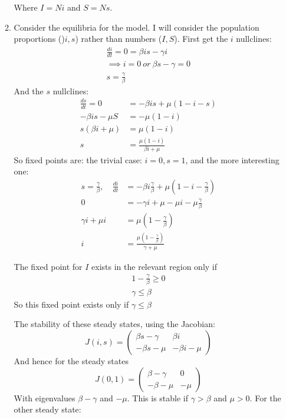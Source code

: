 \documentclass{/home/janmebows/Documents/LatexTemplates/myassignment}
\newcommand{\odd}[2]{\frac{d#1}{d#2}}
\begin{document}
\begin{enumerate}
\begin{enumerate}[label=(\roman*)]
		Where $I = Ni$ and $S = Ns$.
		\item %
			Consider the equilibria for the model. I will consider the population proportions ()$i,s$) rather than numbers ($I,S$).
			First get the $i$ nullclines:
			\begin{align*}
				\odd it = 0=\beta is -\gamma i\\
				\implies i=0 \ or \ \beta s - \gamma =0\\
				s = \frac{\gamma}{\beta}
			\end{align*}
			And the $s$ nullclines:
			\begin{align*}
				\odd st = 0 &= -\beta is+ \mu(1-i-s)\\
				-\beta is - \mu S &= -\mu(1-i)\\
				s(\beta i + \mu) &= \mu(1-i)\\
				s &= \frac{\mu(1-i)}{\beta i + \mu}
			\end{align*}
			So fixed points are: the trivial case: $i=0, s=1$, and the more interesting one:
			\begin{align*}
				s = \frac{\gamma}{\beta}, \quad \odd it &= -\beta i\frac{\gamma}{\beta} + \mu(1-i-\frac{\gamma}{\beta})\\
				0 &=-\gamma i + \mu  - \mu i - \mu\frac{\gamma}{\beta}\\
				\gamma i + \mu i &= \mu(1 - \frac{\gamma}{\beta})\\
				i &= \frac{\mu\left(1 - \frac{\gamma}{\beta}\right)}{\gamma + \mu}
			\end{align*}
			
			The fixed point for $I$ exists in the relevant region only if
			\begin{align*}
				1 - \frac{\gamma}{\beta} \geq0\\
				\gamma \leq \beta
			\end{align*}
			So this fixed point exists only if $\gamma \leq \beta$

			The stability of these steady states, using the Jacobian:
			\[J(i,s) = \begin{pmatrix}
				\beta s - \gamma & \beta i\\
				-\beta s - \mu &-\beta i - \mu
			\end{pmatrix}\]
			And hence for the steady states
			\[J(0,1) = \begin{pmatrix}
				\beta - \gamma & 0\\
				-\beta - \mu & -\mu
			\end{pmatrix}\]
			With eigenvalues $\beta- \gamma$ and $-\mu$. This is stable if $\gamma > \beta$ and $\mu > 0$.
			For the other steady state:


\end{enumerate}
\end{enumerate}
\end{document}
